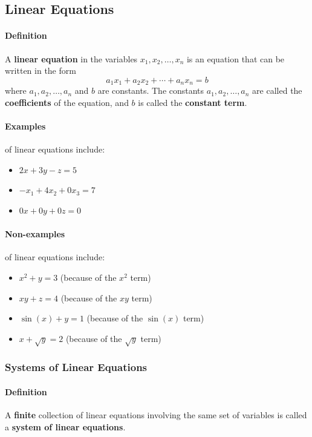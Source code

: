 \subsection{Linear Equations}
\hrulefill

\paragraph{Definition} A \textbf{linear equation} in the variables $x_1, x_2, \ldots, x_n$ is an equation that can be written in the form
\[a_1 x_1 + a_2 x_2 + \cdots + a_n x_n = b\]
where $a_1, a_2, \ldots, a_n$ and $b$ are constants. The constants $a_1, a_2, \ldots, a_n$ are called the \textbf{coefficients} of the equation, and $b$ is called the \textbf{constant term}.

\paragraph*{Examples} of linear equations include:
\begin{itemize}
    \item $2x + 3y - z = 5$
    \item $-x_1 + 4x_2 + 0x_3 = 7$
    \item $0x + 0y + 0z = 0$
\end{itemize}

\paragraph*{Non-examples} of linear equations include:
\begin{itemize}
    \item $x^2 + y = 3$ (because of the $x^2$ term)
    \item $xy + z = 4$ (because of the $xy$ term)
    \item $\sin(x) + y = 1$ (because of the $\sin(x)$ term)
    \item $x + \sqrt{y} = 2$ (because of the $\sqrt{y}$ term)
\end{itemize}

\subsubsection*{Systems of Linear Equations}
\paragraph*{Definition} A \textbf{finite} collection of linear equations involving the same set of variables is called a \textbf{system of linear equations}.
